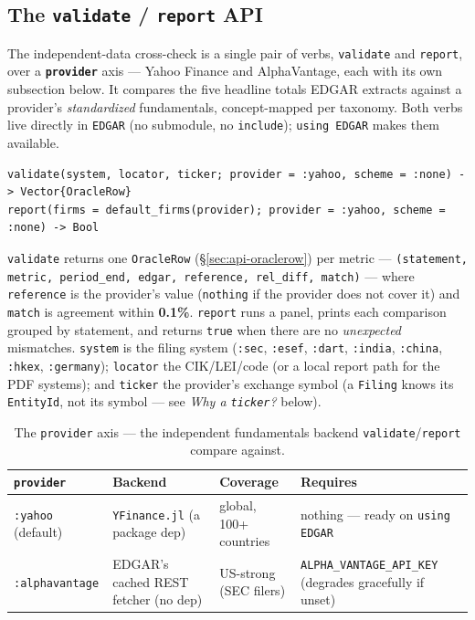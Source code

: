 \documentclass[11pt,a4paper]{report}
\begin{document}
\subsection{The \texttt{validate} / \texttt{report} API}\label{sec:oracle-api}

The independent-data cross-check is a single pair of verbs, \texttt{validate} and \texttt{report}, over a
\textbf{\texttt{provider}} axis --- Yahoo Finance and AlphaVantage, each with its own subsection below. It
compares the five headline totals EDGAR extracts against a provider's \emph{standardized} fundamentals,
concept-mapped per taxonomy. Both verbs live directly in \texttt{EDGAR} (no submodule, no \texttt{include});
\texttt{using EDGAR} makes them available.

\begin{lstlisting}
validate(system, locator, ticker; provider = :yahoo, scheme = :none) -> Vector{OracleRow}
report(firms = default_firms(provider); provider = :yahoo, scheme = :none) -> Bool
\end{lstlisting}

\noindent \texttt{validate} returns one \texttt{OracleRow} (\S\ref{sec:api-oraclerow}) per metric ---
\texttt{(statement, metric, period\_end, edgar, reference, rel\_diff, match)} --- where \texttt{reference} is the provider's value
(\texttt{nothing} if the provider does not cover it) and \texttt{match} is agreement within
\textbf{0.1\%}. \texttt{report} runs a panel, prints each comparison grouped by statement, and returns
\texttt{true} when there are no \emph{unexpected} mismatches. \texttt{system} is the filing system
(\texttt{:sec}, \texttt{:esef}, \texttt{:dart}, \texttt{:india}, \texttt{:china}, \texttt{:hkex},
\texttt{:germany}); \texttt{locator} the CIK/LEI/code (or a local report path for the PDF systems); and
\texttt{ticker} the provider's exchange symbol (a \texttt{Filing} knows its \texttt{EntityId}, not its
symbol --- see \emph{Why a \texttt{ticker}?} below).

\begin{table}[h]
\centering\small
\caption{The \texttt{provider} axis --- the independent fundamentals backend \texttt{validate}/\texttt{report}
compare against.}
\label{tab:oracle-providers}
\begin{tabular}{@{}llll@{}}
\toprule
\textbf{\texttt{provider}} & \textbf{Backend} & \textbf{Coverage} & \textbf{Requires} \\
\midrule
\texttt{:yahoo} (default) & \texttt{YFinance.jl} (a package dep) & global, 100+ countries & nothing --- ready on \texttt{using EDGAR} \\
\texttt{:alphavantage} & EDGAR's cached REST fetcher (no dep) & US-strong (SEC filers) & \texttt{ALPHA\_VANTAGE\_API\_KEY} (degrades gracefully if unset) \\
\bottomrule
\end{tabular}
\end{table}
\end{document}
